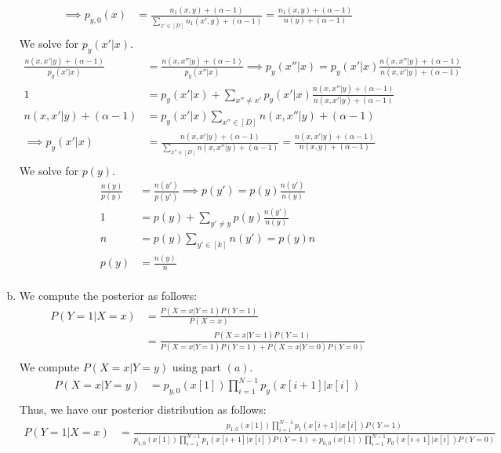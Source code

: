 \documentclass{amsart}
\theoremstyle{definition}
\begin{document}
\begin{enumerate}[(a)]
\begin{align*}
			\implies p_{y, 0}(x) &= \frac{n_1(x,y) + (\alpha - 1)}{\sum_{x' \in [D]} n_1(x', y) + (\alpha - 1)} = \frac{n_1(x,y) + (\alpha - 1)}{n(y) + (\alpha - 1)}\\
		\end{align*}
		We solve for $p_y(x'|x)$.
		\begin{align*}
			\frac{n(x, x'|y) + (\alpha - 1)}{p_y(x'|x)} &= \frac{n(x, x''|y) + (\alpha - 1)}{p_y(x''|x)}\implies p_y(x''|x) = p_y(x'|x)\frac{n(x, x''|y) + (\alpha - 1)}{n(x, x'|y) + (\alpha - 1)}\\
			1 &= p_y(x'|x) + \sum_{x'' \neq x'}p_y(x'|x)\frac{n(x, x''|y) + (\alpha - 1)}{n(x, x'|y) + (\alpha - 1)}\\
			n(x, x'| y) + (\alpha - 1) &= p_y(x'|x)\sum_{x'' \in [D]} n(x, x''|y) + (\alpha - 1)\\
			\implies p_y(x'|x) &= \frac{n(x, x'|y) + (\alpha - 1)}{\sum_{x'' \in [D]} n(x, x''|y) + (\alpha - 1)} = \frac{n(x, x'|y) + (\alpha - 1)}{n(x,y) + (\alpha - 1)}\\
		\end{align*}
		We solve for $p(y)$.
		\begin{align*}
			\frac{n(y)}{p(y)} &= \frac{n(y')}{p(y')}\implies p(y') = p(y)\frac{n(y')}{n(y)}\\
			1 &= p(y) + \sum_{y' \neq y}p(y)\frac{n(y')}{n(y)}\\
			n &= p(y)\sum_{y' \in [k]} n(y') = p(y)n\\
			p(y) &= \frac{n(y)}{n}\\
		\end{align*}
	\item
		We compute the posterior as follows:
		\begin{align*}
			P(Y = 1|X = x) &= \frac{P(X = x| Y = 1)P(Y = 1)}{P(X = x)} \\
			&= \frac{P(X = x|Y = 1)P(Y = 1)}{P(X = x|Y = 1)P(Y = 1) + P(X = x|Y = 0)P(Y = 0)}\\
		\end{align*}
		We compute $P(X = x|Y = y)$ using part $(a)$. 
		\begin{align*}
			P(X = x|Y = y) &= p_{y, 0}(x[1])\prod_{i=1}^{N-1}p_y(x[i + 1]|x[i])\\
		\end{align*}
		Thus, we have our posterior distribution as follows:
		\begin{align*}
			P(Y = 1|X = x) &= \frac{p_{1, 0}(x[1])\prod_{i=1}^{N-1}p_1(x[i + 1]|x[i])P(Y = 1)}{p_{1, 0}(x[1])\prod_{i=1}^{N-1}p_1(x[i + 1]|x[i])P(Y = 1) + p_{0, 0}(x[1])\prod_{i=1}^{N-1}p_0(x[i + 1]|x[i])P(Y = 0)}\\

\end{align*}
\end{enumerate}
\end{document}
